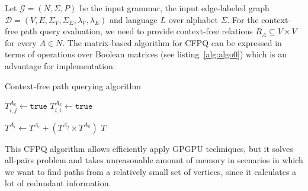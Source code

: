 Let $\mathcal{G} = (N, \Sigma, P)$ be the input grammar, the input edge-labeled graph $\mathcal{D} = (V, E, \Sigma_V, \Sigma_E, \lambda_V, \lambda_E)$ and language $L$ over alphabet $\Sigma$. For the context-free path query evaluation, we need to provide context-free relations \mbox{$R_A \subseteq V \times V$} for every \mbox{$A \in N$}.
The matrix-based algorithm for CFPQ can be expressed in terms of operations over Boolean matrices (see listing~\ref{alg:algo0}) which is an advantage for implementation.
{\footnotesize
\begin{algorithm}
\begin{algorithmic}[1]
\caption{Context-free path querying algorithm}
\label{alg:algo0}
          {$T^{A_k}_{i,j} \gets \texttt{true}$}
    \EndFor
            {$T^{A_k}_{i,i} \gets \texttt{true}$}
        \EndFor
    \EndFor

          { $T^{A_i} \gets T^{A_i} + (T^{A_j} \times T^{A_k})$ } 
        \EndFor
    \EndWhile
\State \Return $T$
\EndFunction
\end{algorithmic}
\end{algorithm}
}

This CFPQ algorithm allows efficiently apply GPGPU techniques, but it solves all-pairs problem and takes unreasonable amount of memory in scenarios in which we want to find paths from a relatively small set of vertices, since it calculates a lot of redundant information.  